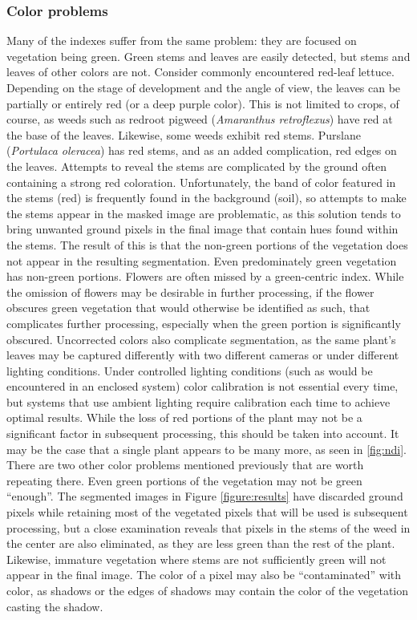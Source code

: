 \documentclass[letterpaper]{report}
\begin{document}
{\subsubsection{Color problems}
\label{section:problems-color}
Many of the indexes suffer from the same problem: they are focused on vegetation being green. Green stems and leaves are easily detected, but stems and leaves of other colors are not. Consider commonly encountered red-leaf lettuce. Depending on the stage of development and the angle of view, the leaves can be partially or entirely red (or a deep purple color). This is not limited to crops, of course, as weeds such as redroot pigweed (\textit{Amaranthus retroflexus}) have red at the base of the leaves. Likewise, some weeds exhibit red stems. Purslane (\textit{Portulaca oleracea}) has red stems, and as an added complication, red edges on the leaves. Attempts to reveal the stems are complicated by the ground often containing a strong red coloration. Unfortunately, the band of color featured in the stems (red) is frequently found in the background (soil), so attempts to make the stems appear in the masked image are problematic, as this solution tends to bring unwanted ground pixels in the final image that contain hues found within the stems. The result of this is that the non-green portions of the vegetation does not appear in the resulting segmentation.  Even predominately green vegetation has non-green portions. Flowers are often missed by a green-centric index. While the omission of flowers may be desirable in further processing, if the flower obscures green vegetation that would otherwise be identified as such, that complicates further processing, especially when the green portion is significantly obscured. Uncorrected colors also complicate segmentation, as the same plant's leaves may be captured differently with two different cameras or under different lighting conditions. Under controlled lighting conditions (such as would be encountered in an enclosed system) color calibration is not essential every time, but systems that use ambient lighting require calibration each time to achieve optimal results. While the loss of red portions of the plant may not be a significant factor in subsequent processing, this should be taken into account. It may be the case that a single plant appears to be many more, as seen in \ref{fig:ndi}.
There are two other color problems mentioned previously that are worth repeating there. Even green portions of the vegetation may not be green ``enough''. The segmented images in Figure \ref{figure:results} have discarded ground pixels while retaining most of the vegetated pixels that will be used is subsequent processing, but a close examination reveals that pixels in the stems of the weed in the center are also eliminated, as they are less green than the rest of the plant. Likewise, immature vegetation where stems are not sufficiently green will not appear in the final image. The color of a pixel may also be ``contaminated'' with color, as shadows or the edges of shadows may contain the color of the vegetation casting the shadow.
}
\end{document}

